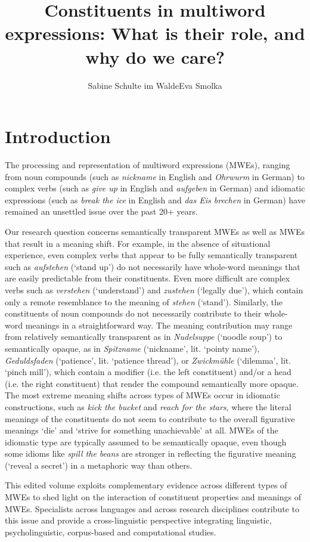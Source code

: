 \documentclass[output=paper]{langsci/langscibook}
\title{Constituents in multiword expressions: What is their role, and why do we care? }
\author{Sabine Schulte im Walde\affiliation{Institut für Maschinelle Sprachverarbeitung, Universität Stuttgart}\lastand  Eva Smolka\affiliation{Fachbereich Linguistik, Universität Konstanz}}
\begin{document}
\section{Introduction}

The processing and representation of multiword expressions (MWEs),
ranging from noun compounds (such as \textit{nickname} in English and
\textit{Ohrwurm} in German) to complex verbs (such as \textit{give up}
in English and \textit{aufgeben} in German) and idiomatic expressions
(such as \textit{break the ice} in English and \textit{das Eis
  brechen} in German) have remained an unsettled issue over the past
20+ years.

Our research question concerns semantically transparent MWEs as well as MWEs that result in a meaning
shift. For example, in the absence of situational experience, even
complex verbs that appear to be fully semantically transparent such as
\textit{aufstehen} (`stand up') do not necessarily have whole-word
meanings that are easily predictable from their constituents. Even
more difficult are complex verbs such as \textit{verstehen}
(`understand') and \textit{zustehen} (`legally due'), which contain
only a remote resemblance to the meaning of \textit{stehen}
(`stand'). Similarly, the constituents of noun compounds do not
necessarily contribute to their whole-word meanings in a
straightforward way. The meaning contribution may range from
relatively semantically transparent as in \textit{Nudelsuppe}
(`noodle soup') to semantically opaque, as in \textit{Spitzname}
(`nickname', lit. `pointy name'), \textit{Geduldsfaden} (`patience', lit. `patience thread'), or  \textit{Zwickmühle} (`dilemma',
lit. `pinch mill'), which contain a modifier (i.e. the left
constituent) and/or a head (i.e. the right constituent) that render the
compound semantically more opaque.  The most extreme meaning shifts
across types of MWEs occur in idiomatic constructions, such as
\textit{kick the bucket} and \textit{reach for the stars}, where the
literal meanings of the constituents do not seem to contribute to the
overall figurative meanings `die' and `strive for something
unachievable' at all. MWEs of the idiomatic type are typically assumed
to be semantically opaque, even though some idioms like \textit{spill
  the beans} are stronger in reflecting the figurative meaning
(`reveal a secret') in a metaphoric way than others.

This edited volume exploits complementary evidence across different
types of MWEs to shed light on the interaction of constituent
properties and meanings of MWEs. Specialists across languages and
across research disciplines contribute to this issue and provide a
cross-linguistic perspective integrating linguistic, psycholinguistic,
corpus-based and computational studies.
\end{document}
